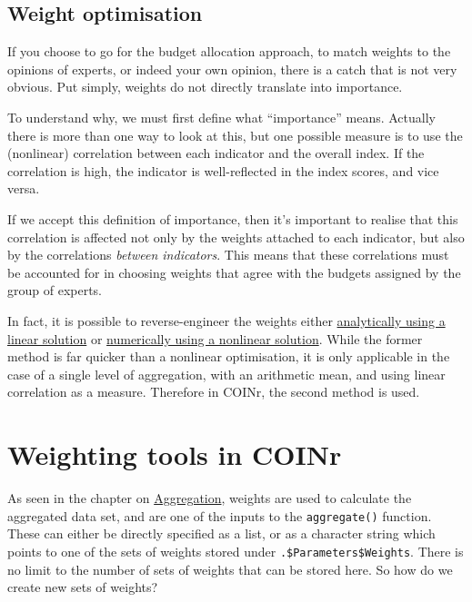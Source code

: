 \documentclass[
]{book}
\begin{document}
\hypertarget{weight-optimisation}{%
\subsection{Weight optimisation}\label{weight-optimisation}}

If you choose to go for the budget allocation approach, to match weights to the opinions of experts, or indeed your own opinion, there is a catch that is not very obvious. Put simply, weights do not directly translate into importance.

To understand why, we must first define what ``importance'' means. Actually there is more than one way to look at this, but one possible measure is to use the (nonlinear) correlation between each indicator and the overall index. If the correlation is high, the indicator is well-reflected in the index scores, and vice versa.

If we accept this definition of importance, then it's important to realise that this correlation is affected not only by the weights attached to each indicator, but also by the correlations \emph{between indicators}. This means that these correlations must be accounted for in choosing weights that agree with the budgets assigned by the group of experts.

In fact, it is possible to reverse-engineer the weights either \href{https://doi.org/10.1111/j.1467-985X.2012.01059.x}{analytically using a linear solution} or \href{https://doi.org/10.1016/j.ecolind.2017.03.056}{numerically using a nonlinear solution}. While the former method is far quicker than a nonlinear optimisation, it is only applicable in the case of a single level of aggregation, with an arithmetic mean, and using linear correlation as a measure. Therefore in COINr, the second method is used.

\hypertarget{weighting-tools-in-coinr}{%
\section{Weighting tools in COINr}\label{weighting-tools-in-coinr}}

As seen in the chapter on \protect\hyperlink{aggregation-1}{Aggregation}, weights are used to calculate the aggregated data set, and are one of the inputs to the \texttt{aggregate()} function. These can either be directly specified as a list, or as a character string which points to one of the sets of weights stored under \texttt{.\$Parameters\$Weights}. There is no limit to the number of sets of weights that can be stored here. So how do we create new sets of weights?
\end{document}
